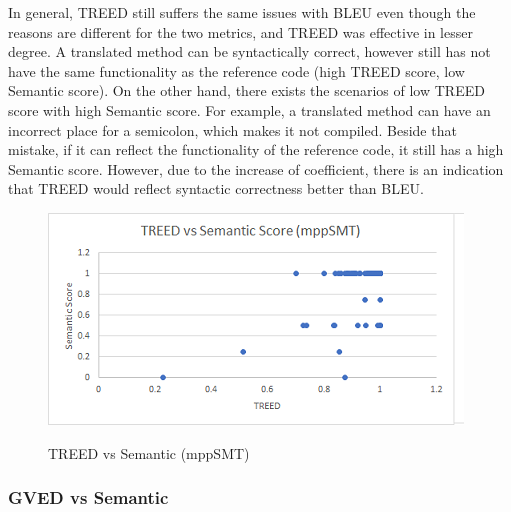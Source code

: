 
In general, TREED still suffers the same issues with BLEU even though
the reasons are different for the two metrics, and TREED was effective
in lesser degree. A translated method can be syntactically correct,
however still has not have the same functionality as the reference
code (high TREED score, low Semantic score). On the other hand, there
exists the scenarios of low TREED score with high Semantic score. For
example, a translated method can have an incorrect place for a
semicolon, which makes it not compiled. Beside that mistake, if it can
reflect the functionality of the reference code, it still has a high
Semantic score. However, due to the increase of coefficient, there is
an indication that TREED would reflect syntactic correctness better
than BLEU.


%
\begin{figure}
\caption{TREED vs Semantic (mppSMT)}
\centering
\includegraphics{img/treed_mppSMT.png}
\label{fig:TREEDmppSMT}
\end{figure}

\subsubsection{\textbf{GVED vs Semantic}}

